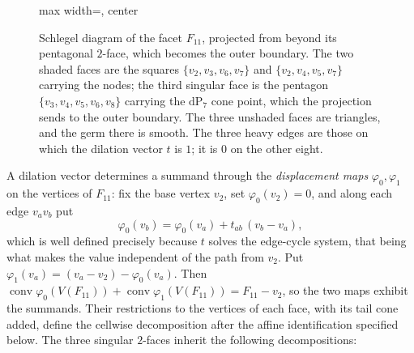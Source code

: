 \documentclass[11pt]{amsart}
\theoremstyle{definition}
\theoremstyle{remark}
\theoremstyle{plain}
\newcommand{\conv}{\operatorname{conv}}
\newcommand{\Cone}{\operatorname{Cone}}
\newcommand{\dP}{\mathrm{dP}}
\begin{document}
\begin{figure}[ht]
\centering
\begin{adjustbox}{max width=\textwidth, center}
\end{adjustbox}
\caption{Schlegel diagram of the facet $F_{11}$, projected from beyond its
pentagonal $2$-face, which becomes the outer boundary.  The two shaded faces
are the squares $\{v_2,v_3,v_6,v_7\}$ and $\{v_2,v_4,v_5,v_7\}$ carrying
the nodes; the third singular face is the pentagon
$\{v_3,v_4,v_5,v_6,v_8\}$ carrying the $\dP_7$ cone point, which the projection
sends to the outer boundary.  The three unshaded faces are triangles, and the
germ there is smooth.  The three heavy edges are those on which the dilation
vector $t$ is $1$; it is $0$ on the other eight.}\label{fig:F11}
\end{figure}

A dilation vector determines a summand through the \emph{displacement maps}
$\varphi_0,\varphi_1$ on the vertices of $F_{11}$: fix the base vertex $v_2$,
set $\varphi_0(v_2)=0$, and along each edge $v_av_b$ put
\[
  \varphi_0(v_b)=\varphi_0(v_a)+t_{ab}\,(v_b-v_a),
\]
which is well defined precisely because $t$ solves the edge-cycle system, that
being what makes the value independent of the path from $v_2$.  Put
$\varphi_1(v_a)=(v_a-v_2)-\varphi_0(v_a)$.  Then
$\conv\varphi_0(V(F_{11}))+\conv\varphi_1(V(F_{11}))=F_{11}-v_2$, so the two
maps exhibit the summands.  Their restrictions to the vertices of each
face, with its tail cone added, define the cellwise decomposition after
the affine identification specified below.  The three singular
$2$-faces inherit the following decompositions:
\end{document}
